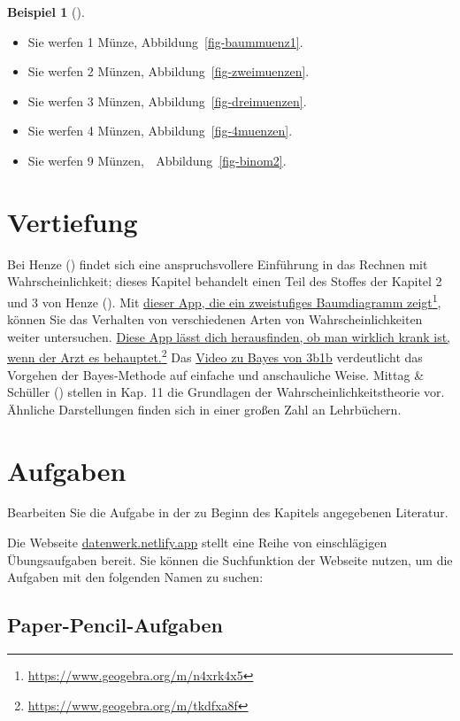 \documentclass[
  ngerman,
  letterpaper,
  twoside,
  open=any]{scrbook}
\providecommand{\tightlist}{%
  \setlength{\itemsep}{0pt}\setlength{\parskip}{0pt}}\usepackage{longtable,booktabs,array}
\theoremstyle{definition}
\newtheorem{example}{Beispiel}[chapter]
\theoremstyle{plain}
\theoremstyle{definition}
\theoremstyle{definition}
\theoremstyle{remark}
\begin{document}
\begin{example}[]
\begin{itemize}
\tightlist
\item
  Sie werfen 1 Münze, Abbildung~\ref{fig-baummuenz1}.
\item
  Sie werfen 2 Münzen, Abbildung~\ref{fig-zweimuenzen}.
\item
  Sie werfen 3 Münzen, Abbildung~\ref{fig-dreimuenzen}.
\item
  Sie werfen 4 Münzen, Abbildung~\ref{fig-4muenzen}.
\item
  Sie werfen 9 Münzen, 🤯 Abbildung~\ref{fig-binom2}.
\end{itemize}

\section{Vertiefung}\label{vertiefung}

Bei Henze () findet sich eine
anspruchsvollere Einführung in das Rechnen mit Wahrscheinlichkeit;
dieses Kapitel behandelt einen Teil des Stoffes der Kapitel 2 und 3 von
Henze (). Mit
\href{https://www.geogebra.org/m/n4xrk4x5}{dieser App, die ein
zweistufiges Baumdiagramm zeigt}\footnote{\url{https://www.geogebra.org/m/n4xrk4x5}},
können Sie das Verhalten von verschiedenen Arten von
Wahrscheinlichkeiten weiter untersuchen.
\href{https://www.geogebra.org/m/tkdfxa8f}{Diese App lässt dich
herausfinden, ob man wirklich krank ist, wenn der Arzt es
behauptet.}\footnote{\url{https://www.geogebra.org/m/tkdfxa8f}} Das
\href{https://youtu.be/HZGCoVF3YvM}{Video zu Bayes von 3b1b}
verdeutlicht das Vorgehen der Bayes-Methode auf einfache und
anschauliche Weise. Mittag \& Schüller ()
stellen in Kap. 11 die Grundlagen der Wahrscheinlichkeitstheorie vor.
Ähnliche Darstellungen finden sich in einer großen Zahl an Lehrbüchern.

\section{Aufgaben}\label{aufgaben-3}

Bearbeiten Sie die Aufgabe in der zu Beginn des Kapitels angegebenen
Literatur.

Die Webseite \href{https://datenwerk.netlify.app}{datenwerk.netlify.app}
stellt eine Reihe von einschlägigen Übungsaufgaben bereit. Sie können
die Suchfunktion der Webseite nutzen, um die Aufgaben mit den folgenden
Namen zu suchen:

\subsection{Paper-Pencil-Aufgaben}\label{paper-pencil-aufgaben-2}


\end{example}
\end{document}
